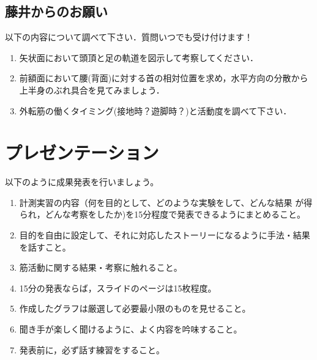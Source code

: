 \documentclass{jarticle}
\begin{document}


\subsection{藤井からのお願い}
以下の内容について調べて下さい．質問いつでも受け付けます！
\begin{enumerate}
\item 矢状面において頭頂と足の軌道を図示して考察してください．
\item 前額面において腰(背面)に対する首の相対位置を求め，水平方向の分散から上半身のぶれ具合を見てみましょう．
\item 外転筋の働くタイミング(接地時？遊脚時？)と活動度を調べて下さい．
\end{enumerate}

\section{プレゼンテーション}
以下のように成果発表を行いましょう。

\begin{enumerate}
\item 計測実習の内容（何を目的として、どのような実験をして、どんな結果
  が得られ，どんな考察をしたか)を15分程度で発表できるようにまとめること。
\item 目的を自由に設定して、それに対応したストーリーになるように手法・結果を話すこと。
\item 筋活動に関する結果・考察に触れること。
\item 15分の発表ならば，スライドのページは15枚程度。
\item 作成したグラフは厳選して必要最小限のものを見せること。
\item 聞き手が楽しく聞けるように、よく内容を吟味すること。
\item 発表前に，必ず話す練習をすること。
\end{enumerate}
\end{document}
